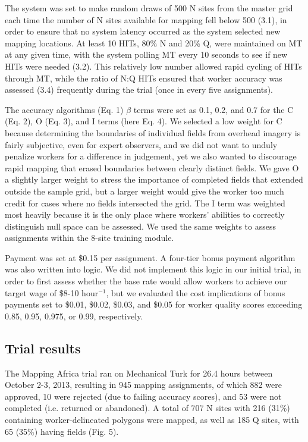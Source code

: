 \documentclass[preprint,12pt,authoryear]{elsarticle}
\begin{document}
The system was set to make random draws of 500 N sites from the master grid each time the number of N sites available for mapping fell below 500 (3.1), in order to ensure that no system latency occurred as the system selected new mapping locations. At least 10 HITs, 80\% N and 20\% Q, were maintained on MT at any given time, with the system polling MT every 10 seconds to see if new HITs were needed (3.2). This relatively low number allowed rapid cycling of HITs through MT, while the ratio of N:Q HITs ensured that worker accuracy was assessed (3.4) frequently during the trial (once in every five assignments). 

The accuracy algorithms (Eq. 1) $\beta$ terms were set as 0.1, 0.2, and 0.7 for the C (Eq. 2), O (Eq. 3), and I terms (here Eq. 4). We selected a low weight for C because determining the boundaries of individual fields from overhead imagery is fairly subjective, even for expert observers, and we did not want to unduly penalize workers for a difference in judgement, yet we also wanted to discourage rapid mapping that erased boundaries between clearly distinct fields. We gave O a slightly larger weight to stress the importance of completed fields that extended outside the sample grid, but a larger weight would give the worker too much credit for cases where no fields intersected the grid. The I term was weighted most heavily because it is the only place where workers' abilities to correctly distinguish null space can be assessed.  We used the same weights to assess assignments within the 8-site training module.       

Payment was set at \$0.15 per assignment. A four-tier bonus payment algorithm was also written into logic. We did not implement this logic in our initial trial, in order to first assess whether the base rate would allow workers to achieve our target wage of \$8-10 hour$^{-1}$, but we evaluated the cost implications of bonus payments set to \$0.01, \$0.02, \$0.03, and \$0.05 for worker quality scores exceeding 0.85, 0.95, 0.975, or 0.99, respectively. 

\subsection{Trial results}
The Mapping Africa trial ran on Mechanical Turk for 26.4 hours between October 2-3, 2013, resulting in 945 mapping assignments, of which 882 were approved, 10 were rejected (due to failing accuracy scores), and 53 were not completed (i.e. returned or abandoned).  A total of 707 N sites with 216 (31\%) containing worker-delineated polygons were mapped, as well as 185 Q sites, with 65 (35\%) having fields (Fig. 5). 
\end{document}
